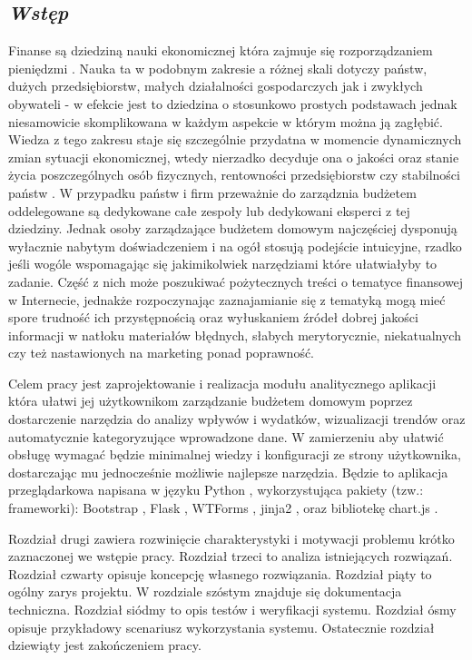 \documentclass[a4paper, 10pt, twoside, openright]{report}
\newcommand{\customstylechapter}[1]{\large{\textit{#1}}}
\begin{document}
\begin{large}
\chapter{\customstylechapter{Wstęp}}
{Finanse są dziedziną nauki ekonomicznej która zajmuje się rozporządzaniem 
pieniędzmi \cite{wiki_ekonomia}. Nauka ta w podobnym zakresie a różnej skali 
dotyczy państw, dużych przedsiębiorstw, małych działalności gospodarczych jak i 
zwykłych obywateli - w efekcie jest to dziedzina o stosunkowo prostych 
podstawach jednak niesamowicie skomplikowana w każdym aspekcie w którym można ją
 zagłębić. Wiedza z tego zakresu staje się szczególnie przydatna w momencie 
dynamicznych zmian sytuacji ekonomicznej, wtedy nierzadko decyduje ona o jakości
 oraz stanie życia poszczególnych osób fizycznych, rentowności przedsiębiorstw 
czy stabilności państw \cite{zapaśćekonomiczna}. W przypadku państw i firm 
przeważnie do zarządznia budżetem oddelegowane są dedykowane całe zespoły lub 
dedykowani eksperci z tej dziedziny. Jednak osoby zarządzające budżetem domowym 
najczęściej dysponują wyłacznie nabytym doświadczeniem i na ogół stosują 
podejście intuicyjne, rzadko jeśli wogóle wspomagając się jakimikolwiek 
narzędziami które ułatwiałyby to zadanie. Część z nich może poszukiwać 
pożytecznych treści o tematyce finansowej w Internecie, jednakże rozpoczynając 
zaznajamianie się z tematyką mogą mieć spore trudność ich przystępnością oraz 
wyłuskaniem źródeł dobrej jakości informacji w natłoku materiałów błędnych, 
słabych merytorycznie, niekatualnych czy też nastawionych na marketing ponad 
poprawność.}

\medskip
{Celem pracy jest zaprojektowanie i realizacja modułu analitycznego aplikacji 
która ułatwi jej użytkownikom zarządzanie budżetem domowym poprzez dostarczenie 
narzędzia do analizy wpływów i wydatków, wizualizacji trendów oraz automatycznie 
kategoryzujące wprowadzone dane. W zamierzeniu aby ułatwić obsługę wymagać 
będzie minimalnej wiedzy i konfiguracji ze strony użytkownika, dostarczając mu 
jednocześnie możliwie najlepsze narzędzia. Będzie to aplikacja przeglądarkowa 
napisana w języku Python \cite{Python}\cite{pythonautomate}, wykorzystująca 
pakiety (tzw.: frameworki): Bootstrap \cite{Bootstrap}, Flask \cite{Flask}, 
WTForms \cite{WTForms}, jinja2 \cite{jinja}, oraz bibliotekę chart.js 
\cite{chart.js}.}

\medskip
{Rozdział drugi zawiera rozwinięcie charakterystyki i motywacji problemu krótko 
zaznaczonej we wstępie pracy. Rozdział trzeci to analiza istniejących rozwiązań.
 Rozdział czwarty opisuje koncepcję własnego rozwiązania. Rozdział piąty to 
ogólny zarys projektu. W rozdziale szóstym znajduje się dokumentacja techniczna.
Rozdział siódmy to opis testów i weryfikacji systemu. Rozdział ósmy opisuje 
przykładowy scenariusz wykorzystania systemu. Ostatecznie rozdział dziewiąty 
jest zakończeniem pracy.}


\end{large}
\end{document}
